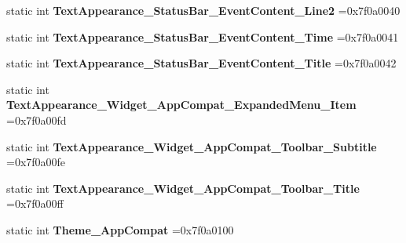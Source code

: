 \begin{DoxyCompactItemize}
\mbox{\label{classandroid_1_1support_1_1graphics_1_1drawable_1_1R_1_1style_a20cf11927e8020d31b16377172dc9843}} 
static int {\bfseries Text\+Appearance\+\_\+\+Status\+Bar\+\_\+\+Event\+Content\+\_\+\+Line2} =0x7f0a0040
\item 
\mbox{\label{classandroid_1_1support_1_1graphics_1_1drawable_1_1R_1_1style_aac4739fcbd50ca08a0aa132797c1d4a5}} 
static int {\bfseries Text\+Appearance\+\_\+\+Status\+Bar\+\_\+\+Event\+Content\+\_\+\+Time} =0x7f0a0041
\item 
\mbox{\label{classandroid_1_1support_1_1graphics_1_1drawable_1_1R_1_1style_ae8d58c14691eb784de4e03b85e8dfddb}} 
static int {\bfseries Text\+Appearance\+\_\+\+Status\+Bar\+\_\+\+Event\+Content\+\_\+\+Title} =0x7f0a0042
\item 
\mbox{\label{classandroid_1_1support_1_1graphics_1_1drawable_1_1R_1_1style_ae9037ea56a6dfcb3d31c70f772788963}} 
static int {\bfseries Text\+Appearance\+\_\+\+Widget\+\_\+\+App\+Compat\+\_\+\+Expanded\+Menu\+\_\+\+Item} =0x7f0a00fd
\item 
\mbox{\label{classandroid_1_1support_1_1graphics_1_1drawable_1_1R_1_1style_a6245d01e33e1f5b72d6cbf5fb611c4f1}} 
static int {\bfseries Text\+Appearance\+\_\+\+Widget\+\_\+\+App\+Compat\+\_\+\+Toolbar\+\_\+\+Subtitle} =0x7f0a00fe
\item 
\mbox{\label{classandroid_1_1support_1_1graphics_1_1drawable_1_1R_1_1style_a111a33d458fdc9752a02eb08ad055d19}} 
static int {\bfseries Text\+Appearance\+\_\+\+Widget\+\_\+\+App\+Compat\+\_\+\+Toolbar\+\_\+\+Title} =0x7f0a00ff
\item 
\mbox{\label{classandroid_1_1support_1_1graphics_1_1drawable_1_1R_1_1style_adb51b941cbc17fa3849316a62433e1c3}} 
static int {\bfseries Theme\+\_\+\+App\+Compat} =0x7f0a0100
\item 

\end{DoxyCompactItemize}
